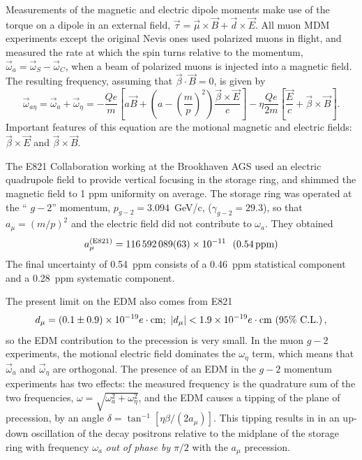 Measurements of the magnetic and electric dipole moments make use of the
torque on a dipole in an external field, $\vec \tau = \vec\mu \times
\vec B + \vec d \times \vec E$. All muon MDM experiments except the original
Nevis ones used polarized muons in flight, and
 measured the rate at which the spin turns relative to the momentum,
$\vec \omega_a =\vec \omega_S - \vec \omega_C$, when a
 beam of polarized muons is injected into a magnetic field.
The resulting frequency, assuming that $\vec \beta \cdot \vec B = 0$,
 is given
by~\cite{Thomas26,Bargmann59}
\begin{equation}
\vec{\omega}_{a\eta}= \vec \omega_a + \vec \omega_\eta = -
 \frac {Qe}  {m}
\left[
a \vec{B}
+ \left( a - \left(  \frac {m} {p} \right)^2  \right)
 \frac {\vec{\beta} \times \vec{E}} {c} \right] -  \eta \frac {Qe}{2m}
 \left[ \frac {\vec{E}} {c}  +  \vec{\beta} \times \vec{B} \right] .
 \label{eq:omegaa-edm1}
\end{equation}
Important features of this equation are the motional magnetic and
electric fields:
$\vec \beta \times \vec E$ and $\vec \beta \times \vec B$.


The E821 Collaboration working at the
Brookhaven AGS used an electric quadrupole field
to provide vertical focusing in the storage ring, and shimmed the magnetic
field to 1 ppm uniformity on average.  The storage ring was operated
 at the `` $g-2$'' momentum, $p_{ g-2} = 3.094$~GeV/c,
($\gamma_{ g-2}= 29.3$),
so that $a_\mu = (m/p)^2$ and the electric field did not
contribute to $\omega_a$.
They obtained\cite{Bennett06}
\begin{equation}
  a_\mu^{(\mathrm{E821})} = 116\,592\,089(63) \times
  10^{-11}~~\mbox{(0.54\,ppm)}
\end{equation}
 The final uncertainty of
0.54~ppm consists of a 0.46~ppm statistical component and a 0.28~ppm
systematic
component.  

The present limit on the EDM also comes from E821~\cite{Bennett08-edm}
\begin{equation}
d_\mu = (0.1 \pm 0.9) \times 10^{-19} e  \cdot {\rm cm}; \
 \vert d_\mu \vert < 1.9 \times 10^{-19}  e  \cdot {\rm cm}\ (95\%\ {\rm C.L.})\, ,
\label{muedm-result}
\end{equation}
so the EDM contribution to the precession is very small.  In the muon $g-2$
experiments, the motional electric field dominates the $\omega_\eta$ term,
which means that $\vec \omega_a$ and $\vec \omega_\eta$ are orthogonal.
The presence of an EDM in the  $g-2$ momentum experiments has two effects:
the measured frequency is the quadrature sum of the two frequencies,
 $\omega = \sqrt{\omega_a^2 + \omega_\eta^2}$, and the EDM causes a tipping of
 the plane of precession, by an angle
 $\delta = \tan ^{-1}[ \eta \beta/(2a_\mu)]$. This tipping results in
 in an up-down oscillation of the decay
 positrons relative to the midplane of the storage ring with frequency
$\omega_a$ {\it out of phase by} $\pi/2$ with the $a_\mu$ precession.





